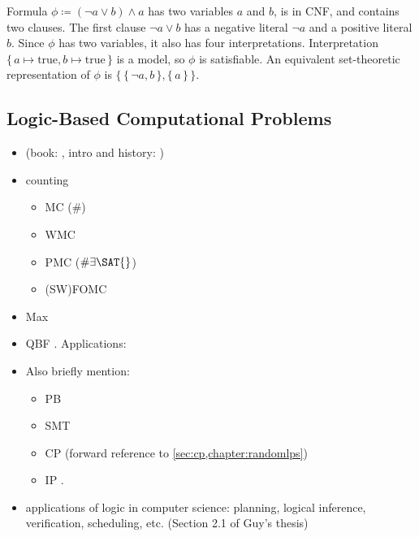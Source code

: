 \begin{example}
  Formula $\phi \coloneqq (\neg a \lor b) \land a$ has two variables $a$ and $b$, is in CNF, and contains two clauses. The first clause $\neg a \lor b$ has a negative literal $\neg a$ and a positive literal $b$. Since $\phi$ has two variables, it also has four interpretations. Interpretation $\{\, a \mapsto \text{true}, b \mapsto \text{true} \,\}$ is a model, so $\phi$ is satisfiable. An equivalent set-theoretic representation of $\phi$ is $\{\, \{\, \neg a, b \,\}, \{\, a \,\} \,\}$.
\end{example}

\subsection{Logic-Based Computational Problems} \label{sec:logicproblems}

\begin{itemize}
\item \SAT{} (book: \citep{DBLP:series/faia/2009-185}, intro and history: \citep{DBLP:series/faia/FrancoM09})
\item counting
  \begin{itemize}
  \item MC (\#\SAT{}) \citep{DBLP:series/faia/GomesSS09}
  \item WMC \citep{DBLP:journals/ai/ChaviraD08}
  \item PMC ($\#\exists\SAT{}$) \citep{DBLP:conf/sat/AzizCMS15}
  \item (SW)FOMC \citep{DBLP:conf/ijcai/BroeckTMDR11}
  \end{itemize}
\item Max\SAT{} \citep{bacchus2021maximum,DBLP:series/faia/LiM09}
\item QBF \citep{DBLP:series/faia/BuningB09}. Applications: \citep{DBLP:conf/ictai/ShuklaBPS19}
\item Also briefly mention:
  \begin{itemize}
  \item PB \citep{DBLP:series/faia/RousselM09}
  \item SMT \citep{DBLP:series/faia/BarrettSST09}
  \item CP \citep{DBLP:reference/fai/2} (forward reference to \cref{sec:cp,chapter:randomlps})
  \item IP \citep{wolsey2020integer}.
  \end{itemize}
\item applications of logic in computer science: planning, logical inference, verification, scheduling, etc. (Section 2.1 of Guy's thesis)
\end{itemize}

